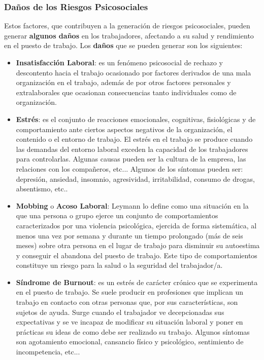 \subsubsection{Daños de los Riesgos Psicosociales}
Estos factores, que contribuyen a la generación de riesgos psicosociales, pueden generar \textbf{algunos daños} en los trabajadores, afectando a su salud y rendimiento en el puesto de trabajo. Los \textbf{daños} que se pueden generar son los siguientes:

\begin{itemize}
    \item \textbf{Insatisfacción Laboral}: es un fenómeno psicosocial de rechazo y descontento hacia el trabajo ocasionado por factores derivados de una mala organización en el trabajo, además de por otros factores personales y extralaborales que ocasionan consecuencias tanto individuales como de organización.

    \item \textbf{Estrés}: es el conjunto de reacciones emocionales, cognitivas, fisiológicas y de comportamiento ante ciertos aspectos negativos de la organización, el contenido o el entorno de trabajo. El estrés en el trabajo se produce cuando las demandas del entorno laboral exceden la capacidad de los trabajadores para controlarlas. Algunas causas pueden ser la cultura de la empresa, las relaciones con los compañeros, etc... Algunos de los síntomas pueden ser: depresión, ansiedad, insomnio, agresividad, irritabilidad, consumo de drogas, absentismo, etc..

    \item \textbf{Mobbing} o \textbf{Acoso Laboral}: Leymann lo define como una situación en la que una persona o grupo ejerce un conjunto de comportamientos caracterizados por una violencia psicológica, ejercida de forma sistemática, al menos una vez por semana y durante un tiempo prolongado (más de seis meses) sobre otra persona en el lugar de trabajo para disminuir su autoestima y conseguir el abandona del puesto de trabajo. Este tipo de comportamientos constituye un riesgo para la salud o la seguridad del trabajador/a.

    \item \textbf{Síndrome de Burnout}: es un estrés de carácter crónico que se experimenta en el puesto de trabajo. Se suele producir en profesiones que implican un trabajo en contacto con otras personas que, por sus características, son sujetos de ayuda. Surge cuando el trabajador ve decepcionadas sus expectativas y se ve incapaz de modificar su situación laboral y poner en prácticas su ideas de como debe ser realizado su trabajo. Algunos síntomas son agotamiento emocional, cansancio físico y psicológico, sentimiento de incompetencia, etc...
\end{itemize}

